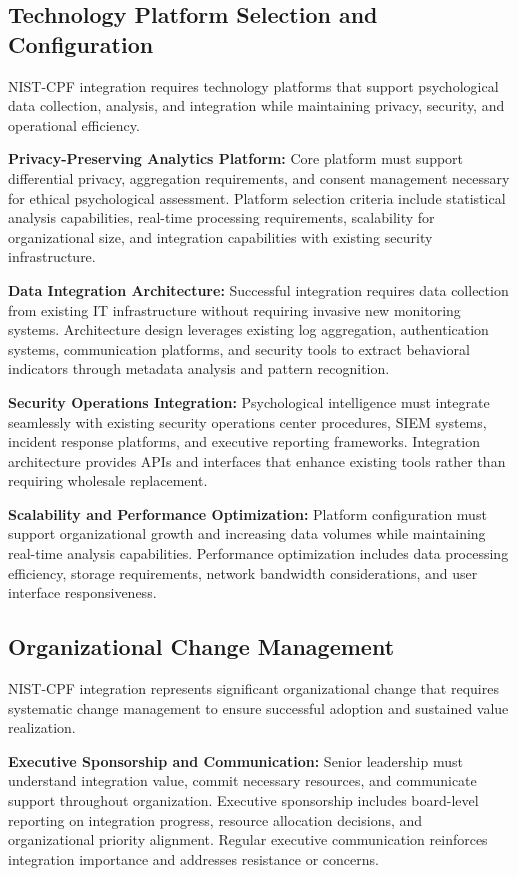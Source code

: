 \documentclass[10pt, twocolumn]{article}
\begin{document}
\subsection{Technology Platform Selection and Configuration}

NIST-CPF integration requires technology platforms that support psychological data collection, analysis, and integration while maintaining privacy, security, and operational efficiency.

\textbf{Privacy-Preserving Analytics Platform:} Core platform must support differential privacy, aggregation requirements, and consent management necessary for ethical psychological assessment. Platform selection criteria include statistical analysis capabilities, real-time processing requirements, scalability for organizational size, and integration capabilities with existing security infrastructure.

\textbf{Data Integration Architecture:} Successful integration requires data collection from existing IT infrastructure without requiring invasive new monitoring systems. Architecture design leverages existing log aggregation, authentication systems, communication platforms, and security tools to extract behavioral indicators through metadata analysis and pattern recognition.

\textbf{Security Operations Integration:} Psychological intelligence must integrate seamlessly with existing security operations center procedures, SIEM systems, incident response platforms, and executive reporting frameworks. Integration architecture provides APIs and interfaces that enhance existing tools rather than requiring wholesale replacement.

\textbf{Scalability and Performance Optimization:} Platform configuration must support organizational growth and increasing data volumes while maintaining real-time analysis capabilities. Performance optimization includes data processing efficiency, storage requirements, network bandwidth considerations, and user interface responsiveness.

\subsection{Organizational Change Management}

NIST-CPF integration represents significant organizational change that requires systematic change management to ensure successful adoption and sustained value realization.

\textbf{Executive Sponsorship and Communication:} Senior leadership must understand integration value, commit necessary resources, and communicate support throughout organization. Executive sponsorship includes board-level reporting on integration progress, resource allocation decisions, and organizational priority alignment. Regular executive communication reinforces integration importance and addresses resistance or concerns.
\end{document}
